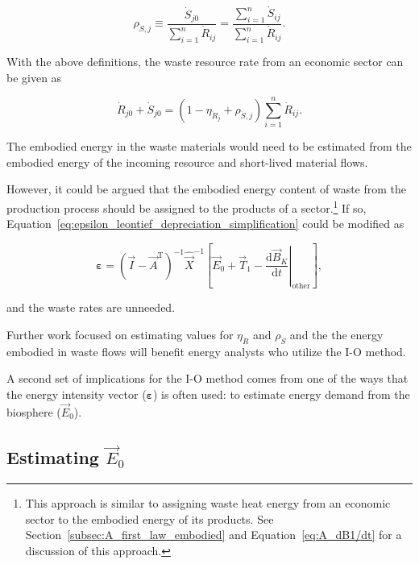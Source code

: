 \begin{equation}
	\rho_{\dot{S},j}
	\equiv \frac{\dot{S}_{j0}}{\sum\limits_{i=1}^{n} \dot{R}_{ij}}
	= \frac{\sum\limits_{i=1}^{n} \dot{S}_{ij}}{\sum\limits_{i=1}^{n} \dot{R}_{ij}}.
\end{equation} 

With the above definitions, the waste resource rate from an economic sector
can be given as

\begin{equation}
	\dot{R}_{j0} + \dot{S}_{j0}
	= (1 - \eta_{\dot{R}_{j}} + \rho_{\dot{S},j}) \sum\limits_{i=1}^{n} \dot{R}_{ij}.
\end{equation}

\noindent{}The embodied energy in the waste materials would need to be estimated
from the embodied energy of the incoming resource and short-lived material flows.

However, it could be argued that the embodied energy content 
of waste from the production process should be 
assigned to the products of a sector.\footnote{This approach 
is similar to assigning waste heat energy from an
economic sector to the embodied energy of its products.
See Section~\ref{subsec:A_first_law_embodied} and
Equation~\ref{eq:A_dB1/dt} for a discussion of this approach.}
If so, Equation~\ref{eq:epsilon_leontief_depreciation_simplification}
could be modified as

\begin{equation} \label{eq:epsilon_leontief_without_waste}
	\boldsymbol{\varepsilon} 
	= {(\vec{I} - \vec{A}^{\mathrm{T}})}^{-1}\hat{\vec{X}}^{-1}
		\left[\vec{E}_{0} 
				+ \vec{T}_{1} 
				- \left. \frac{\mathrm{d}\vec{B}_{K}}{\mathrm{d}t} \right|_{\mathrm{other}}
		\right],
\end{equation}

\noindent{}and the waste rates are unneeded.

Further work focused on estimating values for 
$\eta_{\dot{R}}$ and $\rho_{\dot{S}}$
and the the energy embodied in waste flows 
will benefit energy analysts who utilize the I-O method.

A second set of implications for the I-O method 
comes from one of the ways that 
the energy intensity vector ($\boldsymbol{\varepsilon}$)
is often used: to estimate energy demand from the biosphere ($\vec{E}_{0}$).


\subsection{Estimating $\vec{E}_{0}$}

